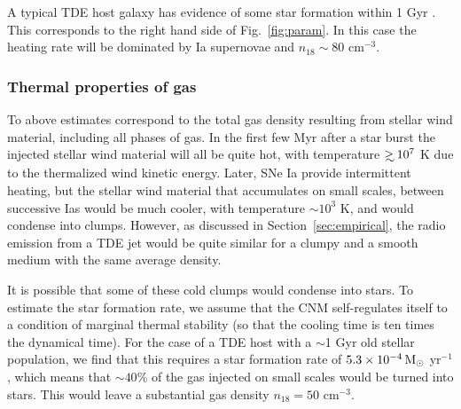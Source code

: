 \documentclass[usenatbib,fleqn]{mnras}
\newcommand\gsim{\mathrel{\rlap{\lower4pt\hbox{\hskip1pt$\sim$}}
    \raise1pt\hbox{$>$}}}
\newcommand{\Msun}{{\rm M_\odot}}
\begin{document}
A typical TDE host galaxy has evidence of some star formation
within 1 Gyr \citep{French+2016}. This corresponds to the right hand side
of Fig.~\ref{fig:param}. In this case the heating rate will be
dominated by Ia supernovae and $n_{18}\sim 80$ cm$^{-3}$.

\subsubsection{Thermal properties of gas}

To above estimates correspond to the total gas density resulting from
stellar wind material, including all phases of gas. In the first few
Myr after a star burst the injected stellar wind material will all be
quite hot, with temperature $\gsim 10^{7}$ K due to the thermalized
wind kinetic energy. Later, SNe Ia provide intermittent heating, but
the stellar wind material that accumulates on small scales, between
successive Ias would be much cooler, with temperature $\sim 10^{3}$ K,
and would condense into clumps. However, as discussed in
Section~\ref{sec:empirical}, the radio emission from a TDE jet would
be quite similar for a clumpy and a smooth medium with the same
average density.



It is possible that some of these cold clumps would condense into
stars. To estimate the star formation rate, we assume that the CNM
self-regulates itself to a condition of marginal thermal stability (so
that the cooling time is ten times the dynamical time). For the case
of a TDE host with a $\sim$1 Gyr old stellar population, we find that
this requires a star formation rate of  $5.3 \times 10^{-4}
\,\Msun$ yr$^{-1}$, which means that $\sim 40$\% of the gas injected
on small scales would be turned into stars. This would leave a
substantial gas density $n_{18}=50$ cm$^{-3}$.
\end{document}
